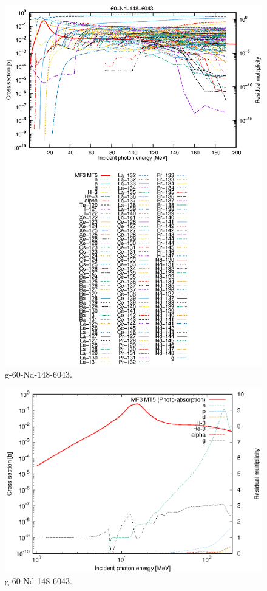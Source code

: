\begin{figure}
 \includegraphics[width=\linewidth]{eps/g_60-Nd-148_6043.eps}
  \caption{g-60-Nd-148-6043.}
\end{figure}
\newpage \clearpage

\begin{figure}
 \includegraphics[width=\linewidth]{eps-log/g_60-Nd-148_6043.eps}
 \caption{g-60-Nd-148-6043.}
\end{figure}
\newpage \clearpage

